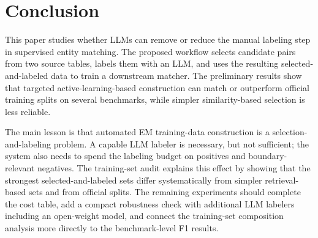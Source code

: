 \section{Conclusion}

This paper studies whether LLMs can remove or reduce the manual labeling step in supervised entity matching. The proposed workflow selects candidate pairs from two source tables, labels them with an LLM, and uses the resulting selected-and-labeled data to train a downstream matcher. The preliminary results show that targeted active-learning-based construction can match or outperform official training splits on several benchmarks, while simpler similarity-based selection is less reliable.

The main lesson is that automated EM training-data construction is a selection-and-labeling problem. A capable LLM labeler is necessary, but not sufficient; the system also needs to spend the labeling budget on positives and boundary-relevant negatives. The training-set audit explains this effect by showing that the strongest selected-and-labeled sets differ systematically from simpler retrieval-based sets and from official splits. The remaining experiments should complete the cost table, add a compact robustness check with additional LLM labelers including an open-weight model, and connect the training-set composition analysis more directly to the benchmark-level F1 results.
